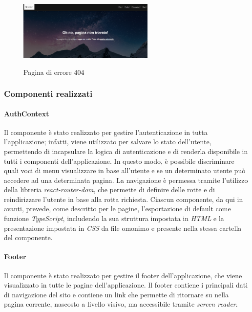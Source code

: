 \begin{figure}[h]
    \centering
    \includegraphics[width=0.6\textwidth, alt={Schermata della pagina di errore 404}]{immagini/frontend/404.png}
    \caption{Pagina di errore 404}\label{fig:errore-404}
\end{figure}

\newpage

\subsubsection{Componenti realizzati}

\paragraph{AuthContext}
Il componente è stato realizzato per gestire l'autenticazione in tutta l'applicazione; infatti, viene utilizzato per salvare lo stato dell'utente,
permettendo di incapsulare la logica di autenticazione e di renderla disponibile in tutti i componenti dell'applicazione.
In questo modo, è possibile discriminare quali voci di menu visualizzare in base all'utente e se un determinato utente può accedere ad una determinata pagina.
La navigazione è permessa tramite l'utilizzo della libreria \textit{react-router-dom}, che permette di definire delle rotte e di reindirizzare l'utente in base alla rotta richiesta.
Ciascun componente, da qui in avanti, prevede, come descritto per le pagine, l'esportazione di default come funzione \textit{TypeScript}, includendo la sua struttura impostata in \textit{HTML} e la presentazione impostata in \textit{CSS} da file omonimo
e presente nella stessa cartella del componente.

\paragraph{Footer}
Il componente è stato realizzato per gestire il footer dell'applicazione, che viene visualizzato in tutte le pagine dell'applicazione.
Il footer contiene i principali dati di navigazione del sito e contiene un link che permette di ritornare su nella pagina corrente, nascosto a livello visivo, ma accessibile tramite \textit{screen reader}.

